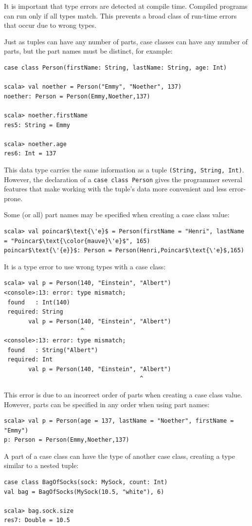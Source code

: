 It is important that type errors are detected at compile time. Compiled
programs can run only if all types match. This prevents a broad class
of run-time errors that occur due to wrong types. 

Just as tuples can have any number of parts, case classes can have
any number of parts, but the part names must be distinct, for example:
\begin{lstlisting}
case class Person(firstName: String, lastName: String, age: Int)

scala> val noether = Person("Emmy", "Noether", 137)
noether: Person = Person(Emmy,Noether,137)

scala> noether.firstName
res5: String = Emmy

scala> noether.age
res6: Int = 137
\end{lstlisting}
This data type carries the same information as a tuple \lstinline!(String, String, Int)!.
However, the declaration of a \lstinline!case class Person! gives
the programmer several features that make working with the tuple\textsf{'}s
data more convenient and less error-prone.

Some (or all) part names may be specified when creating a case class
value:
\begin{lstlisting}[extendedchars=true,mathescape=true]
scala> val poincar$\text{\'e}$ = Person(firstName = "Henri", lastName = "Poincar$\text{\color{mauve}\'e}$", 165)
poincar$\text{\'{e}}$: Person = Person(Henri,Poincar$\text{\'e}$,165)
\end{lstlisting}
It is a type error to use wrong types with a case class:
\begin{lstlisting}
scala> val p = Person(140, "Einstein", "Albert")
<console>:13: error: type mismatch;
 found   : Int(140)
 required: String
       val p = Person(140, "Einstein", "Albert")
                      ^
<console>:13: error: type mismatch;
 found   : String("Albert")
 required: Int
       val p = Person(140, "Einstein", "Albert")
                                       ^
\end{lstlisting}
This error is due to an incorrect order of parts when creating a case
class value. However, parts can be specified in any order when using
part names:
\begin{lstlisting}
scala> val p = Person(age = 137, lastName = "Noether", firstName = "Emmy")
p: Person = Person(Emmy,Noether,137)
\end{lstlisting}
A part of a case class can have the type of another case class, creating
a type similar to a nested tuple:
\begin{lstlisting}
case class BagOfSocks(sock: MySock, count: Int)
val bag = BagOfSocks(MySock(10.5, "white"), 6)

scala> bag.sock.size
res7: Double = 10.5
\end{lstlisting}


